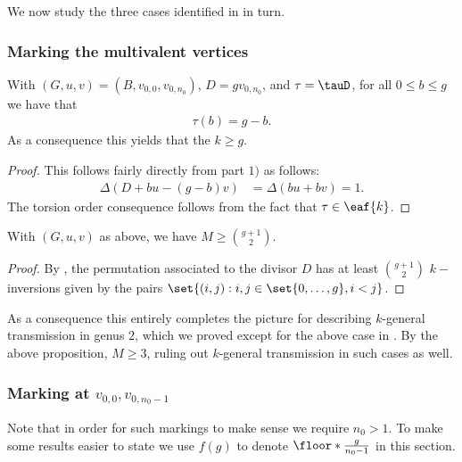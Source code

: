 We now study the three cases identified in  in turn.

\subsubsection{Marking the multivalent vertices}\label{subsub-g+1}
\begin{lemma}\label{lem-TriangleInversionII}
    With $(G,u,v) = (B, v_{0,0},v_{0,n_0})$, $D = g v_{0,n_0}$, and $\tau = \tauD$, for all $0 \leq b \leq g$ we have that
    \begin{align*}
        \tau(b) = g-b.
    \end{align*}
    As a consequence this yields that the $k \geq g$.
\end{lemma}

\begin{proof}
    This follows fairly directly from  part $1)$ as follows:
    \begin{align*}
        \Delta(D+bu-(g-b)v) &= \Delta(bu+bv) = 1.
    \end{align*}
    The torsion order consequence follows from the fact that $\tau \in \eaf{k}$.
\end{proof}

\begin{prop}\label{prop-TriangleInversionNumber}
    With $(G,u,v)$ as above, we have $M \geq \binom{g+1}{2}$.
\end{prop}

\begin{proof}
    By , the permutation associated to the divisor $D$ has at least $\binom{g+1}{2}$ $k-$inversions given by the pairs $\set{(i,j):i,j \in \set{0,\dots,g}, i<j}$.
\end{proof}

\begin{rema}
    As a consequence this entirely completes the picture for describing $k$-general transmission in genus $2$, which we proved except for the above case in . By the above proposition, $M\geq 3$, ruling out $k$-general transmission in such cases as well.
\end{rema}

\subsubsection{\texorpdfstring{Marking at $v_{0,0},v_{0,n_0-1}$}{Marking at v\_0,0 and v\_0,n0-1}}
Note that in order for such markings to make sense we require $n_0>1$. To make some results easier to state we use $f(g)$ to denote $\floor*{ \frac{g}{n_0-1}}$ in this section.

